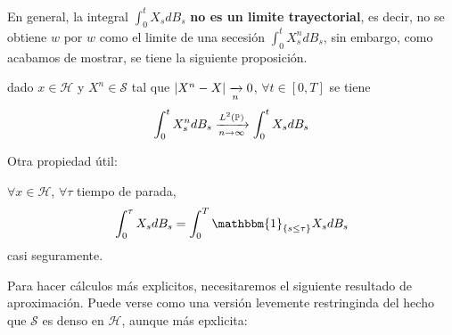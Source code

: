 \begin{remark}
    En general, la integral $\int_{0}^{t}X_s dB_s$ \textbf{no es un limite trayectorial}, es decir, no 
    se obtiene $w$ por $w$ como el limite de una secesión $\int_{0}^{t} X_s^n dB_s$, sin embargo, como 
    acabamos de mostrar, se tiene la siguiente proposición.
\end{remark}
\begin{proposition}
        dado $x \in \mathcal{H}$ y $X^n \in \mathcal{S}$ tal que $\abs{X^n - X} \xrightarrow[n]{} 0$, 
        $\forall t \in [0,T]$ se tiene 
        \begin{equation*}
                \int_{0}^{t} X_s^n dB_s \xrightarrow[n \to \infty]{L^2(\P)} \int_{0}^{t}X_s dB_s
        \end{equation*}
\end{proposition}

Otra propiedad útil: 

\begin{proposition}
        $\forall  x \in \mathcal{H}$, $\forall \tau$ tiempo de parada,
        \begin{equation*}
                \int_{0}^{\tau} X_s dB_s = \int_{0}^{T} \mathbbm{1}_{\{s \le \tau \}} X_s dB_s 
        \end{equation*}
        casi seguramente.
\end{proposition}

Para hacer cálculos más explicitos, necesitaremos el siguiente resultado de aproximación. Puede 
verse como una versión levemente restringinda del hecho que $\mathcal{S}$ es denso en $\mathcal{H}$, 
aunque más epxlicita: 

